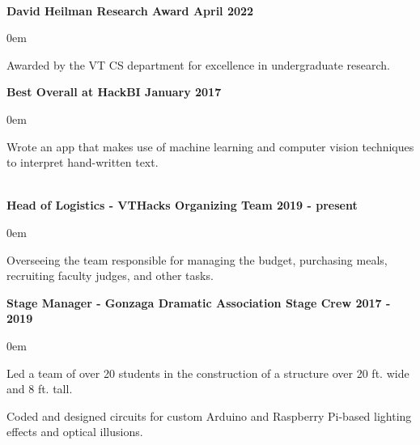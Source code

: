 \documentclass{article}
\begin{document}
\begin{center}
\begin{flushleft}
    {\large\textbf{\underline{}}} \\
    \textbf{David Heilman Research Award \hfill April 2022}
    \begin{compactitem}
      \itemsep0em
      \item Awarded by the VT CS department for excellence in undergraduate research.
    \end{compactitem}

    \textbf{Best Overall at HackBI \hfill January 2017}
    \begin{compactitem}
      \itemsep0em
      \item Wrote an app that makes use of machine learning and computer vision techniques to interpret hand-written text.
    \end{compactitem}


    {\large\textbf{\underline{}}} \\

    \textbf{Head of Logistics - VTHacks Organizing Team \hfill 2019 - present}
    \begin{compactitem}
      \itemsep0em
      \item Overseeing the team responsible for managing the budget, purchasing meals, recruiting faculty judges, and other tasks.
    \end{compactitem}

    \textbf{Stage Manager - Gonzaga Dramatic Association Stage Crew \hfill 2017 - 2019}
    \begin{compactitem}
      \itemsep0em
      \item Led a team of over 20 students in the construction of a structure over 20 ft. wide and 8 ft. tall.
      \item Coded and designed circuits for custom Arduino and Raspberry Pi-based lighting effects and optical illusions.
    \end{compactitem}


\end{flushleft}
\end{center}
\end{document}
